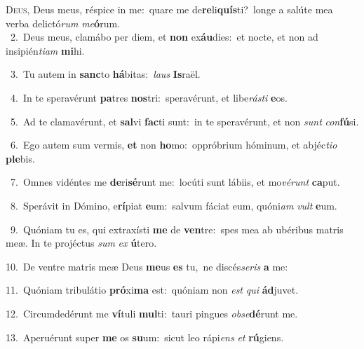 \lettrine{\initial\textcolor{\initialcolor}{D}}{eus,} Deus meus, réspice in me:~\dagger quare me de\-\textbf{re}\-li\-\textbf{quís}\-ti?~\star longe a salúte mea verba delictó\textit{rum} \textit{me}\-\textbf{ó}rum.\\
{\numbfont\textcolor{\numbcolor}{~2.}}~Deus meus, clamábo per diem, et \textbf{non} ex\-\textbf{áu}\-dies:~\star et nocte, et non ad insipién\-\textit{ti}\-\textit{am} \textbf{mi}\-hi.\par
{\numbfont\textcolor{\numbcolor}{~3.}}~Tu autem in \textbf{sanc}\-to \textbf{há}\-bitas:~\star \textit{laus} \textbf{Is}\-raël.\par
{\numbfont\textcolor{\numbcolor}{~4.}}~In te speravérunt \textbf{pa}\-tres \textbf{nos}\-tri:~\star speravérunt, et libe\-\textit{rás}\-\textit{ti} \textbf{e}\-os.\par
{\numbfont\textcolor{\numbcolor}{~5.}}~Ad te clamavérunt, et \textbf{sal}\-vi \textbf{fac}\-ti sunt:~\star in te speravérunt, et non \textit{sunt} \textit{con}\-\textbf{fú}si.\par
{\numbfont\textcolor{\numbcolor}{~6.}}~Ego autem sum vermis, \textbf{et} non \textbf{ho}\-mo:~\star oppróbrium hóminum, et abjéc\-\textit{ti}\-\textit{o} \textbf{ple}\-bis.\par
{\numbfont\textcolor{\numbcolor}{~7.}}~Omnes vidéntes me \textbf{de}\-ri\-\textbf{sé}\-runt me:~\star locúti sunt lábiis, et mo\-\textit{vé}\-\textit{runt} \textbf{ca}\-put.\par
{\numbfont\textcolor{\numbcolor}{~8.}}~Sperávit in Dómino, e\-\textbf{rí}\-piat \textbf{e}\-um:~\star salvum fáciat eum, quóni\textit{am} \textit{vult} \textbf{e}\-um.\par
{\numbfont\textcolor{\numbcolor}{~9.}}~Quóniam tu es, qui extraxísti \textbf{me} de \textbf{ven}\-tre:~\star spes mea ab ubéribus matris meæ. In te projéctus \textit{sum} \textit{ex} \textbf{ú}\-tero.\par
{\numbfont\textcolor{\numbcolor}{10.}}~De ventre matris meæ Deus \textbf{me}\-us \textbf{es} tu,~\star ne discés\-\textit{se}\-\textit{ris} \textbf{a} me:\par
{\numbfont\textcolor{\numbcolor}{11.}}~Quóniam tribulátio \textbf{pró}\-xi\textbf{ma} est:~\star quóniam non \textit{est} \textit{qui} \textbf{ád}\-juvet.\par
{\numbfont\textcolor{\numbcolor}{12.}}~Circumdedérunt me \textbf{ví}\-tuli \textbf{mul}\-ti:~\star tauri pingues \textit{ob}\-\textit{se}\textbf{dé}runt me.\par
{\numbfont\textcolor{\numbcolor}{13.}}~Aperuérunt super \textbf{me} os \textbf{su}\-um:~\star sicut leo rápi\textit{ens} \textit{et} \textbf{rú}\-giens.\par
